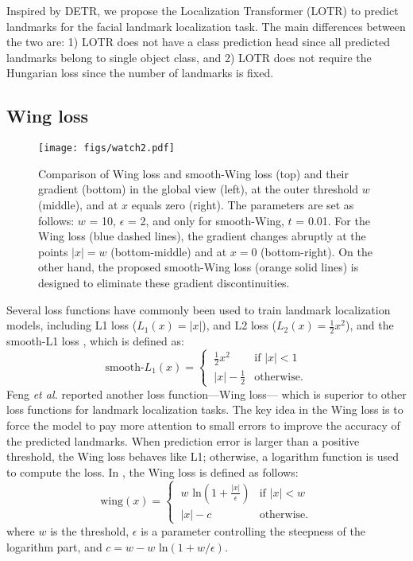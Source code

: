 \documentclass[journal]{IEEEtran}
\begin{document}
Inspired by DETR, we propose the Localization Transformer (LOTR) to predict landmarks for the facial landmark localization task.
The main differences between the two are: 1) LOTR does not have a class prediction head since all predicted landmarks belong to single object class, and 2) LOTR does not require the Hungarian loss since the number of landmarks is fixed.

\subsection{Wing loss}\label{subsec:wing}

\begin{figure*}
    \centering
\texttt{[image: figs/watch2.pdf]}
    \caption{Comparison of Wing loss and smooth-Wing loss (top) and their gradient (bottom) in the global view (left), at the outer threshold $w$ (middle), and at $x$ equals zero (right). The parameters are set as follows: $w$ = 10, $\epsilon$ = 2, and only for smooth-Wing, $t$ = 0.01. 
    For the Wing loss (blue dashed lines), the gradient changes abruptly at the points $|x| = w$ (bottom-middle) and at $x = 0$ (bottom-right).
    On the other hand, the proposed smooth-Wing loss (orange solid lines) is designed to eliminate these gradient discontinuities. 
    }
    \label{fig:wing_vs_s-wing}
\end{figure*}
Several loss functions have commonly been used to train landmark localization models, including L1 loss ($L_1(x) = |x|$), and L2 loss ($L_2(x) = \frac{1}{2} x^2$), and the smooth-L1 loss \cite{girshick2015}, which is defined as:
\begin{equation}
    \label{eq:smooth-l1}
    \text{smooth-}L_1(x) =
    \begin{cases}
        \ \frac{1}{2} x^2     & \text{if } |x| < 1 \\
        \ |x| - \frac{1}{2}   & \text{otherwise.} 
    \end{cases}
\end{equation}
Feng \textit{et al.} \cite{Feng2017} reported another loss function---Wing loss--- which is superior to other loss functions for landmark localization tasks.
The key idea in the Wing loss is to force the model to pay more attention to small errors to improve the accuracy of the predicted landmarks. 
When prediction error is larger than a positive threshold, the Wing loss behaves like L1; otherwise, a logarithm function is used to compute the loss. 
In \cite{Feng2017}, the Wing loss is defined as follows:
\begin{equation}    
    \label{eq:wing}
    \text{wing}(x) = 
    \begin{cases}
        \ w \text{ ln}(1 + \frac{|x|}{\epsilon})     & \text{if } |x| < w \\
        \ |x| - c   & \text{otherwise.} 
    \end{cases}
\end{equation}
where $w$ is the threshold, $\epsilon$ is a parameter controlling the steepness of the logarithm part, and $c = w - w \text{ ln}(1 + w/\epsilon)$. 
\end{document}
